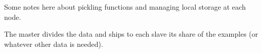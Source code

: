 \documentclass[%
        final,
        notitlepage,
        narroweqnarray,
        inline,
        ]{ieee}
\begin{document}
Some notes here about pickling functions and managing local storage at each
node.

The master divides the data and ships to each slave its share of the examples
(or whatever other data is needed).

%
%

%
%
%
%
%
%
%
%
%
%
%
%
%
%
%
%
\end{document}
